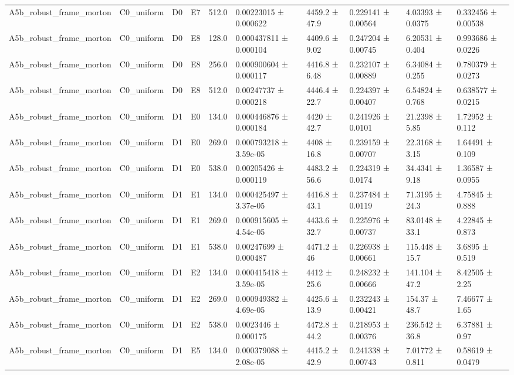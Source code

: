 \begin{table}
\begin{tabular}{llllllllll}
A5b\_robust\_frame\_morton & C0\_uniform & D0 & E7 & 512.0 & 0.00223015 ± 0.000622 & 4459.2 ± 47.9 & 0.229141 ± 0.00564 & 4.03393 ± 0.0375 & 0.332456 ± 0.00538 \\
A5b\_robust\_frame\_morton & C0\_uniform & D0 & E8 & 128.0 & 0.000437811 ± 0.000104 & 4409.6 ± 9.02 & 0.247204 ± 0.00745 & 6.20531 ± 0.404 & 0.993686 ± 0.0226 \\
A5b\_robust\_frame\_morton & C0\_uniform & D0 & E8 & 256.0 & 0.000900604 ± 0.000117 & 4416.8 ± 6.48 & 0.232107 ± 0.00889 & 6.34084 ± 0.255 & 0.780379 ± 0.0273 \\
A5b\_robust\_frame\_morton & C0\_uniform & D0 & E8 & 512.0 & 0.00247737 ± 0.000218 & 4446.4 ± 22.7 & 0.224397 ± 0.00407 & 6.54824 ± 0.768 & 0.638577 ± 0.0215 \\
A5b\_robust\_frame\_morton & C0\_uniform & D1 & E0 & 134.0 & 0.000446876 ± 0.000184 & 4420 ± 42.7 & 0.241926 ± 0.0101 & 21.2398 ± 5.85 & 1.72952 ± 0.112 \\
A5b\_robust\_frame\_morton & C0\_uniform & D1 & E0 & 269.0 & 0.000793218 ± 3.59e-05 & 4408 ± 16.8 & 0.239159 ± 0.00707 & 22.3168 ± 3.15 & 1.64491 ± 0.109 \\
A5b\_robust\_frame\_morton & C0\_uniform & D1 & E0 & 538.0 & 0.00205426 ± 0.000119 & 4483.2 ± 56.6 & 0.224319 ± 0.0174 & 34.4341 ± 9.18 & 1.36587 ± 0.0955 \\
A5b\_robust\_frame\_morton & C0\_uniform & D1 & E1 & 134.0 & 0.000425497 ± 3.37e-05 & 4416.8 ± 43.1 & 0.237484 ± 0.0119 & 71.3195 ± 24.3 & 4.75845 ± 0.888 \\
A5b\_robust\_frame\_morton & C0\_uniform & D1 & E1 & 269.0 & 0.000915605 ± 4.54e-05 & 4433.6 ± 32.7 & 0.225976 ± 0.00737 & 83.0148 ± 33.1 & 4.22845 ± 0.873 \\
A5b\_robust\_frame\_morton & C0\_uniform & D1 & E1 & 538.0 & 0.00247699 ± 0.000487 & 4471.2 ± 46 & 0.226938 ± 0.00661 & 115.448 ± 15.7 & 3.6895 ± 0.519 \\
A5b\_robust\_frame\_morton & C0\_uniform & D1 & E2 & 134.0 & 0.000415418 ± 3.59e-05 & 4412 ± 25.6 & 0.248232 ± 0.00666 & 141.104 ± 47.2 & 8.42505 ± 2.25 \\
A5b\_robust\_frame\_morton & C0\_uniform & D1 & E2 & 269.0 & 0.000949382 ± 4.69e-05 & 4425.6 ± 13.9 & 0.232243 ± 0.00421 & 154.37 ± 48.7 & 7.46677 ± 1.65 \\
A5b\_robust\_frame\_morton & C0\_uniform & D1 & E2 & 538.0 & 0.0023446 ± 0.000175 & 4472.8 ± 44.2 & 0.218953 ± 0.00376 & 236.542 ± 36.8 & 6.37881 ± 0.97 \\
A5b\_robust\_frame\_morton & C0\_uniform & D1 & E5 & 134.0 & 0.000379088 ± 2.08e-05 & 4415.2 ± 42.9 & 0.241338 ± 0.00743 & 7.01772 ± 0.811 & 0.58619 ± 0.0479 \\

\end{tabular}
\end{table}
